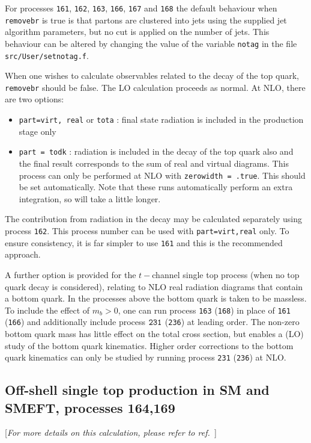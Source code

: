 For processes {\tt 161}, {\tt 162}, {\tt 163}, {\tt 166}, {\tt 167}
and {\tt 168} the default behaviour when {\tt removebr} is true is that
partons are clustered into jets using the supplied jet
algorithm parameters, but no cut is applied on the number of jets.
This behaviour can be altered by changing the value of the
variable {\tt notag} in the file {\tt src/User/setnotag.f}.
 
When one wishes to calculate observables related to the decay of the top
quark, {\tt removebr} should be false.
The LO calculation proceeds as normal. At NLO, there are two options:
\begin{itemize}
\item {\tt part=virt, real} or {\tt tota} : final state radiation is included
in the production stage only
\item {\tt part = todk} : radiation is included in the decay of the top
quark also and the final result corresponds to the sum of real and virtual
diagrams. This process can only be performed at NLO with 
{\tt zerowidth = .true}. This should be set automatically.
Note that these runs automatically perform an extra integration, so
will take a little longer.
\end{itemize}

The contribution from radiation in the decay may be calculated separately using
process {\tt 162}. This process number can be used with {\tt part=virt,real}
only. To ensure consistency, it is far simpler to use {\tt 161}
and this is the recommended approach.

A further option is provided for the $t-$channel single top process (when no
top quark decay is considered), relating to NLO real radiation diagrams that
contain a bottom quark. In the processes above the bottom quark is taken to
be massless. To include the effect of $m_b > 0$, one can run process
{\tt 163} ({\tt 168}) in place of {\tt 161} ({\tt 166}) and additionally include
process $\tt 231$ ({\tt 236}) at leading order.
The non-zero bottom quark mass has little effect on
the total cross section, but enables a (LO) study of the bottom quark kinematics.
Higher order corrections to the bottom quark kinematics can only be studied by running
process {\tt 231} ({\tt 236}) at NLO.

\subsection{Off-shell single top production in SM and SMEFT, processes 164,169}
\label{subsec:offstop}
\begin{center}
	[{\it For more details on this calculation, please refer to ref.~\cite{Neumann:2019kvk}}]
\end{center}

